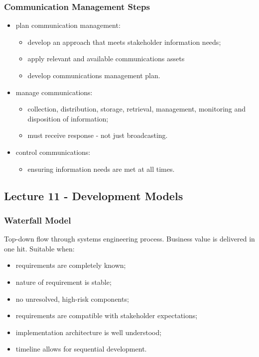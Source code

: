 \documentclass[journal]{IEEEtran}
\begin{document}
\subsubsection{Communication Management Steps}
\begin{itemize}
	\item plan communication management:
	\begin{itemize}
		\item develop an approach that meets stakeholder information needs;
		\item apply relevant and available communications assets
		\item develop communications management plan.
	\end{itemize}
	\item manage communications:
	\begin{itemize}
		\item collection, distribution, storage, retrieval, management, monitoring and disposition of information;
		\item must receive response - not just broadcasting.
	\end{itemize}
	\item control communications:
	\begin{itemize}
		\item ensuring information needs are met at all times.
	\end{itemize}
\end{itemize}
\subsection{\textbf{Lecture 11 - Development Models}}
\subsubsection{Waterfall Model}
Top-down flow through systems engineering process. Business value is delivered in one hit. Suitable when:
\begin{itemize}
	\item requirements are completely known;
	\item nature of requirement is stable;
	\item no unresolved, high-risk components;
	\item requirements are compatible with stakeholder expectations;
	\item implementation architecture is well understood;
	\item timeline allows for sequential development.
\end{itemize}
\end{document}
